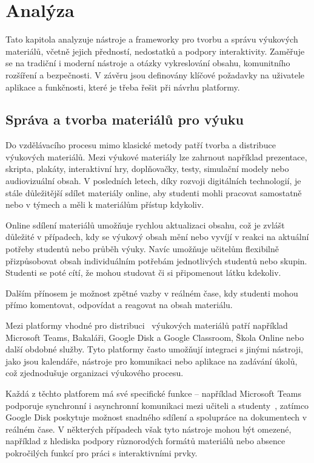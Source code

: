 \chapter{Analýza}

\begin{chapterabstract}
Tato kapitola analyzuje nástroje a frameworky pro tvorbu a správu výukových materiálů, včetně jejich předností, nedostatků a podpory interaktivity. 
Zaměřuje se na tradiční i moderní nástroje a otázky vykreslování obsahu, komunitního rozšíření a bezpečnosti. 
V závěru jsou definovány klíčové požadavky na uživatele aplikace a funkčnosti, které je třeba řešit při návrhu platformy.
\end{chapterabstract}


\section{Správa a tvorba materiálů pro výuku}

Do vzdělávacího procesu mimo klasické metody patří tvorba a distribuce výukových materiálů.
Mezi výukové materiály lze zahrnout například prezentace, skripta, plakáty, interaktivní hry, doplňovačky, testy, simulační modely nebo audiovizuální obsah.
V posledních letech, díky rozvoji digitálních technologií, je stále důležitější sdílet materiály online, aby studenti mohli pracovat samostatně nebo v týmech a měli k materiálům přístup kdykoliv.

Online sdílení materiálů umožňuje rychlou aktualizaci obsahu, což je zvlášt důležité v případech, kdy se výukový obsah mění nebo vyvíjí v reakci na aktuální potřeby studentů nebo průběh výuky.
Navíc umožňuje učitelům flexibilně přizpůsobovat obsah individuálním potřebám jednotlivých studentů nebo skupin.
Studenti se poté cítí, že mohou studovat či si připomenout látku kdekoliv.

Dalším přínosem je možnost zpětné vazby v reálném čase, kdy studenti mohou přímo komentovat, odpovídat a reagovat na obsah materiálu.

Mezi platformy vhodné pro distribuci~\cite{msmt_aplikace} výukových materiálů patří například Microsoft Teams, Bakaláři, Google Disk a Google Classroom, Škola Online nebo další obdobné služby.
Tyto platformy často umožňují integraci s jinými nástroji, jako jsou kalendáře, nástroje pro komunikaci nebo aplikace na zadávání úkolů, což zjednodušuje organizaci výukového procesu.

Každá z těchto platforem má své specifické funkce -- například Microsoft Teams podporuje synchronní i asynchronní komunikaci mezi učiteli a studenty~\cite{teams}, zatímco Google Disk poskytuje možnost snadného sdílení a spolupráce na dokumentech v reálném čase.
V některých případech však tyto nástroje mohou být omezené, například z hlediska podpory různorodých formátů materiálů nebo absence pokročilých funkcí pro práci s interaktivními prvky.

